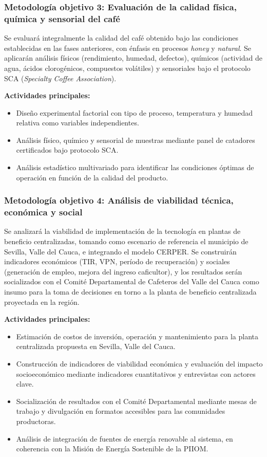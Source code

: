 \subsubsection*{Metodología objetivo 3: Evaluación de la calidad física, química y sensorial 
del café}

Se evaluará integralmente la calidad del café obtenido bajo las condiciones 
establecidas en las fases anteriores, con énfasis en procesos \textit{honey} y 
\textit{natural}. Se aplicarán análisis físicos (rendimiento, humedad, defectos), 
químicos (actividad de agua, ácidos clorogénicos, compuestos volátiles) y sensoriales 
bajo el protocolo SCA (\textit{Specialty Coffee Association}).

\textbf{Actividades principales:}
\begin{itemize}
    \item Diseño experimental factorial con tipo de proceso, temperatura y humedad 
    relativa como variables independientes.
    \item Análisis físico, químico y sensorial de muestras mediante panel de catadores 
    certificados bajo protocolo SCA.
    \item Análisis estadístico multivariado para identificar las condiciones óptimas 
    de operación en función de la calidad del producto.
\end{itemize}

\subsubsection*{Metodología objetivo 4: Análisis de viabilidad técnica, económica y social}

Se analizará la viabilidad de implementación de la tecnología en plantas de beneficio 
centralizadas, tomando como escenario de referencia el municipio de Sevilla, Valle 
del Cauca, e integrando el modelo CERPER. Se construirán indicadores económicos 
(TIR, VPN, período de recuperación) y sociales (generación de empleo, mejora del 
ingreso caficultor), y los resultados serán socializados con el Comité Departamental 
de Cafeteros del Valle del Cauca como insumo para la toma de decisiones en torno a 
la planta de beneficio centralizada proyectada en la región.

\textbf{Actividades principales:}
\begin{itemize}
    \item Estimación de costos de inversión, operación y mantenimiento para la planta 
    centralizada propuesta en Sevilla, Valle del Cauca.
    \item Construcción de indicadores de viabilidad económica y evaluación del impacto 
    socioeconómico mediante indicadores cuantitativos y entrevistas con actores clave.
    \item Socialización de resultados con el Comité Departamental mediante mesas de 
    trabajo y divulgación en formatos accesibles para las comunidades productoras.
    \item Análisis de integración de fuentes de energía renovable al sistema, en 
    coherencia con la Misión de Energía Sostenible de la PIIOM.
\end{itemize}
